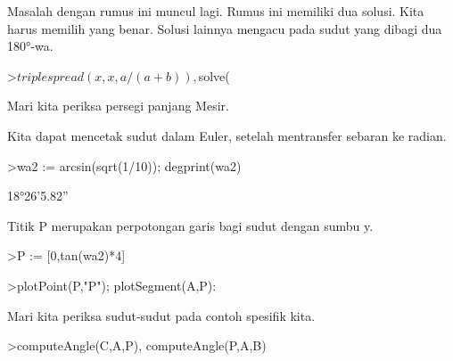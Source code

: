 \documentclass[a4paper,10pt]{article}
\begin{document}
\begin{eulernotebook}
\begin{eulercomment}
\begin{eulercomment}
\begin{eulercomment}
\begin{eulercomment}
\begin{eulercomment}
\begin{eulercomment}
\begin{eulercomment}
\begin{eulercomment}
\begin{eulercomment}
\begin{eulercomment}
\begin{eulercomment}
\begin{eulercomment}
\begin{eulercomment}
\begin{eulercomment}
\begin{eulercomment}
\begin{eulercomment}
\begin{eulercomment}
\begin{eulercomment}
\begin{eulercomment}
\begin{eulercomment}
\begin{eulercomment}
\begin{eulercomment}
\begin{eulercomment}
\begin{eulercomment}
\begin{eulercomment}
\begin{eulercomment}
\begin{eulercomment}
\begin{eulercomment}
\begin{eulercomment}
\begin{eulercomment}
\begin{eulercomment}
Masalah dengan rumus ini muncul lagi. Rumus ini memiliki dua solusi.
Kita harus memilih yang benar. Solusi lainnya mengacu pada sudut yang
dibagi dua 180°-wa.
\end{eulercomment}
\begin{eulerprompt}
>$triplespread(x,x,a/(a+b)), $solve(%
\end{eulerprompt}
\begin{eulercomment}
Mari kita periksa persegi panjang Mesir.
\end{eulercomment}
\begin{eulercomment}
Kita dapat mencetak sudut dalam Euler, setelah mentransfer sebaran ke
radian.
\end{eulercomment}
\begin{eulerprompt}
>wa2 := arcsin(sqrt(1/10)); degprint(wa2)
\end{eulerprompt}
\begin{euleroutput}
  18°26'5.82''
\end{euleroutput}
\begin{eulercomment}
Titik P merupakan perpotongan garis bagi sudut dengan sumbu y.
\end{eulercomment}
\begin{eulerprompt}
>P := [0,tan(wa2)*4]
\end{eulerprompt}
\begin{euleroutput}
  [0,  1.33333]
\end{euleroutput}
\begin{eulerprompt}
>plotPoint(P,"P"); plotSegment(A,P):
\end{eulerprompt}
\begin{eulercomment}
Mari kita periksa sudut-sudut pada contoh spesifik kita.
\end{eulercomment}
\begin{eulerprompt}
>computeAngle(C,A,P), computeAngle(P,A,B)

\end{eulerprompt}
\end{eulercomment}
\end{eulercomment}
\end{eulercomment}
\end{eulercomment}
\end{eulercomment}
\end{eulercomment}
\end{eulercomment}
\end{eulercomment}
\end{eulercomment}
\end{eulercomment}
\end{eulercomment}
\end{eulercomment}
\end{eulercomment}
\end{eulercomment}
\end{eulercomment}
\end{eulercomment}
\end{eulercomment}
\end{eulercomment}
\end{eulercomment}
\end{eulercomment}
\end{eulercomment}
\end{eulercomment}
\end{eulercomment}
\end{eulercomment}
\end{eulercomment}
\end{eulercomment}
\end{eulercomment}
\end{eulercomment}
\end{eulercomment}
\end{eulercomment}
\end{eulernotebook}
\end{document}
